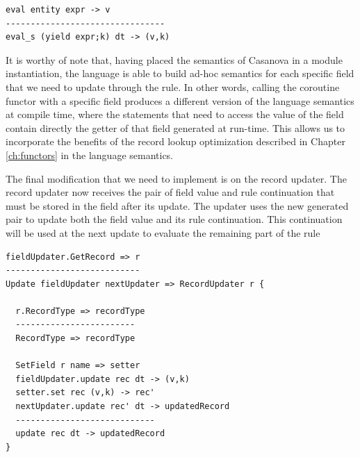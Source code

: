 \begin{lstlisting}
eval entity expr -> v
--------------------------------
eval_s (yield expr;k) dt -> (v,k)
\end{lstlisting}

\noindent
It is worthy of note that, having placed the semantics of Casanova in a module instantiation, the language is able to build ad-hoc semantics for each specific field that we need to update through the rule. In other words, calling the coroutine functor with a specific field produces a different version of the language semantics at compile time, where the statements that need to access the value of the field contain directly the getter of that field generated at run-time. This allows us to incorporate the benefits of the record lookup optimization described in Chapter \ref{ch:functors} in the language semantics.

The final modification that we need to implement is on the record updater. The record updater now receives the pair of field value and rule continuation that must be stored in the field after its update. The updater uses the new generated pair to update both the field value and its rule continuation. This continuation will be used at the next update to evaluate the remaining part of the rule

\begin{lstlisting}
fieldUpdater.GetRecord => r
---------------------------
Update fieldUpdater nextUpdater => RecordUpdater r {

  r.RecordType => recordType
  ------------------------
  RecordType => recordType

  SetField r name => setter
  fieldUpdater.update rec dt -> (v,k)
  setter.set rec (v,k) -> rec'
  nextUpdater.update rec' dt -> updatedRecord
  ----------------------------
  update rec dt -> updatedRecord
}
\end{lstlisting}


